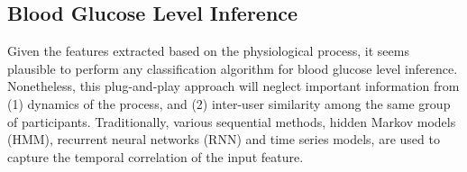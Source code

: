 

%


\subsection{Blood Glucose Level Inference}
Given the features extracted based on the physiological process, it seems plausible to perform any classification algorithm for blood glucose level inference.
Nonetheless, this plug-and-play approach will neglect important information from (1) dynamics of the process, and (2) inter-user similarity among the same group of participants.
Traditionally, various sequential methods, \eg hidden Markov models (HMM), recurrent neural networks (RNN) and time series models, are used to capture the temporal correlation of the input feature.

